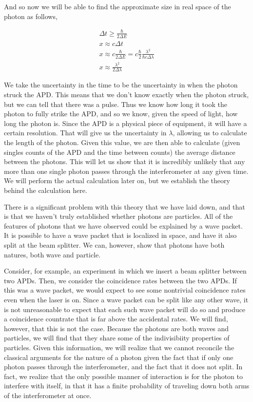 \documentclass{article}
\begin{document}
	And so now we will be able to find the approximate size in real space of the photon as follows,

	\begin{gather*}
		\Delta t \geq \frac{\hbar}{2\Delta E} \\
		x \approx c\Delta t \\
		x \approx c\frac{\hbar}{2\Delta E} = c\frac{\hbar}{2}\frac{\lambda^2}{\hbar c \Delta \lambda} \\
		x \approx \frac{\lambda^2}{2\Delta \lambda}
	\end{gather*}

	We take the uncertainty in the time to be the uncertainty in when the photon struck the APD.  This means that we don't know exactly when the photon struck, but we can tell that there was a pulse.  Thus we know how long it took the photon to fully strike the APD, and so we know, given the speed of light, how long the photon is.  Since the APD is a physical piece of equipment, it will have a certain resolution.  That will give us the uncertainty in $\lambda$, allowing us to calculate the length of the photon.  Given this value, we are then able to calculate (given singles counts of the APD and the time between counts) the average distance between the photons.  This will let us show that it is incredibly unlikely that any more than one single photon passes through the interferometer at any given time.  We will perform the actual calculation later on, but we establish the theory behind the calculation here.

	\hspace{.5cm}

	There is a significant problem with this theory that we have laid down, and that is that we haven't truly established whether photons are particles.  All of the features of photons that we have observed could be explained by a wave packet.  It is possible to have a wave packet that is localized in space, and have it also split at the beam splitter.  We can, however, show that photons have both natures, both wave and particle.

	\hspace{.5cm}

	Consider, for example, an experiment in which we insert a beam splitter between two APDs.  Then, we consider the coincidence rates between the two APDs.  If this was a wave packet, we would expect to see some nontrivial coincidence rates even when the laser is on.  Since a wave packet can be split like any other wave, it is not unreasonable to expect that each such wave packet will do so and produce a coincidence countrate that is far above the accidental rates.  We will find, however, that this is not the case.  Because the photons are both waves and particles, we will find that they share some of the indivisibiity properties of particles.  Given this information, we will realize that we cannot reconcile the classical arguments for the nature of a photon given the fact that if only one photon passes through the interferometer, and the fact that it does not split.  In fact, we realize that the only possible manner of interaction is for the photon to interfere with itself, in that it has a finite probability of traveling down both arms of the interferometer at once.
\end{document}

